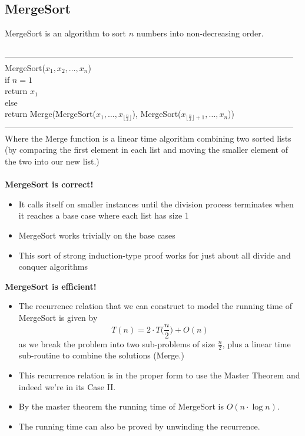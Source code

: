 \documentclass{article}
\newcommand{\tb}[1]{\textbf{#1}}
\newcommand{\x}{\cdot}
\newcommand{\ds}{\displaystyle}
\newcommand{\floor}[1]{\lfloor #1 \rfloor}
\begin{document}
\subsection{MergeSort}
MergeSort is an algorithm to sort $n$ numbers into non-decreasing order.\\\\
---------------------------------------------------------------------------------------------------------
MergeSort($x_1, x_2, \dots, x_n$)\\
	\hspace*{7mm} if $n=1$\\
	\hspace*{14mm} return $x_1$\\
	\hspace*{7mm} else\\
	\hspace*{14mm} return Merge(MergeSort($x_1, \dots, x_{\floor{\frac{n}{2}}}$), MergeSort($x_{\floor{\frac{n}{2}}+1}, \dots, x_n$))\\
---------------------------------------------------------------------------------------------------------\\
Where the Merge function is a linear time algorithm combining two sorted lists (by comparing the first element in each list and moving the smaller element of the two into our new list.)\\\\
\tb{MergeSort is correct!}
\begin{itemize}
	\item It calls itself on smaller instances until the division process terminates when it reaches a base case where each list has size 1
	\item MergeSort works trivially on the base cases
	\item This sort of strong induction-type proof works for just about all divide and conquer algorithms
\end{itemize}
\tb{MergeSort is efficient!}
\begin{itemize}
	\item The recurrence relation that we can construct to model the running time of MergeSort is given by
	\[T(n) = 2\x T\Big(\frac{n}{2}\Big) + O(n)\]
	as we break the problem into two sub-problems of size $\ds \frac{n}{2}$, plus a linear time sub-routine to combine the solutions (Merge.)
	\item This recurrence relation is in the proper form to use the Master Theorem and indeed we're in its Case II.
	\item By the master theorem the running time of MergeSort is $O(n\x \log n)$.
	\item The running time can also be proved by unwinding the recurrence.
\end{itemize}
\end{document}
